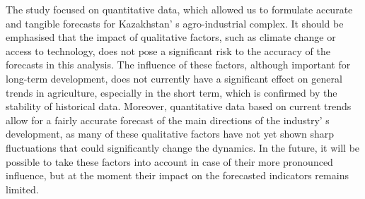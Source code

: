 
The study focused on quantitative data, which allowed us to formulate
accurate and tangible forecasts for Kazakhstan' s
agro-industrial complex. It should be emphasised that the impact of
qualitative factors, such as climate change or access to technology,
does not pose a significant risk to the accuracy of the forecasts in
this analysis. The influence of these factors, although important for
long-term development, does not currently have a significant effect on
general trends in agriculture, especially in the short term, which is
confirmed by the stability of historical data. Moreover, quantitative
data based on current trends allow for a fairly accurate forecast of the
main directions of the industry' s development, as many
of these qualitative factors have not yet shown sharp fluctuations that
could significantly change the dynamics. In the future, it will be
possible to take these factors into account in case of their more
pronounced influence, but at the moment their impact on the forecasted
indicators remains limited.

